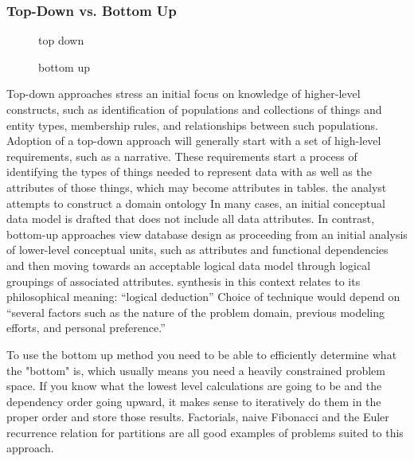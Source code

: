\subsubsection{Top-Down vs. Bottom Up}


%
\begin{figure}[h]
\centering
\hspace*{0.15\linewidth}

\caption{top down}
\label{fig:top-down}
\end{figure}
%

%
\begin{figure}[h]
\centering
\hspace*{0.15\linewidth}

\caption{bottom up}
\label{fig:bottom-up}
\end{figure}
%

\cite{kung_comparing_2013}
Top-down approaches stress an initial focus on knowledge of higher-level constructs, such as identification of populations and collections of things and entity types, membership rules, and relationships between such populations. Adoption of a top-down approach will generally start with a set of high-level requirements, such as a narrative. These requirements start a process of identifying the types of things needed to represent data with as well as the attributes of those things, which may become attributes in tables.
the analyst attempts to construct a domain ontology
In many cases, an initial conceptual data model is drafted that does not include all data attributes.
In contrast, bottom-up approaches view database design as proceeding from an initial analysis of lower-level conceptual units, such as attributes and functional dependencies and then moving towards an acceptable logical data model through logical groupings of associated attributes.
synthesis in this context relates to its philosophical meaning: “logical deduction”
Choice of technique would depend on “several factors such as the nature of the problem domain, previous modeling efforts, and personal preference.”

\cite{jones_answer_2011}
To use the bottom up method you need to be able to efficiently determine what the "bottom" is, which usually means you need a heavily constrained problem space. If you know what the lowest level calculations are going to be and the dependency order going upward, it makes sense to iteratively do them in the proper order and store those results. Factorials, naive Fibonacci and the Euler recurrence relation for partitions are all good examples of problems suited to this approach.

